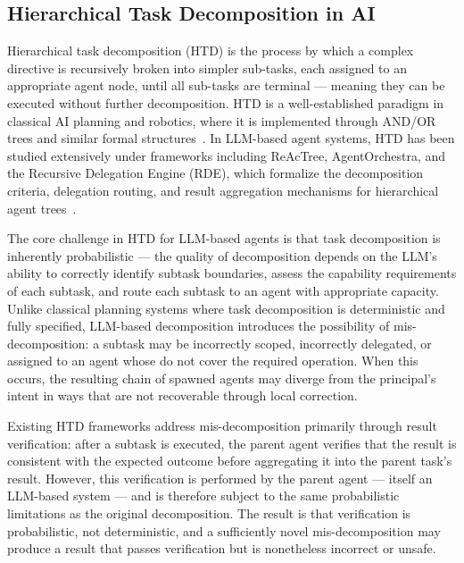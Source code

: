 \subsection{Hierarchical Task Decomposition in AI}
\label{sec:task-decomp}

Hierarchical task decomposition (HTD) is the process by which a complex directive is recursively broken into simpler sub-tasks, each assigned to an appropriate agent node, until all sub-tasks are terminal — meaning they can be executed without further decomposition. HTD is a well-established paradigm in classical AI planning and robotics, where it is implemented through AND/OR trees and similar formal structures~\cite{structuredagent2025}. In LLM-based agent systems, HTD has been studied extensively under frameworks including ReAcTree, AgentOrchestra, and the Recursive Delegation Engine (RDE), which formalize the decomposition criteria, delegation routing, and result aggregation mechanisms for hierarchical agent trees~\cite{reactree2025,agentorchestra2025,rde2025,rde2024,agentspawn2025}.

The core challenge in HTD for LLM-based agents is that task decomposition is inherently probabilistic — the quality of decomposition depends on the LLM's ability to correctly identify subtask boundaries, assess the capability requirements of each subtask, and route each subtask to an agent with appropriate capacity. Unlike classical planning systems where task decomposition is deterministic and fully specified, LLM-based decomposition introduces the possibility of mis-decomposition: a subtask may be incorrectly scoped, incorrectly delegated, or assigned to an agent whose \bounds{} do not cover the required operation. When this occurs, the resulting chain of spawned agents may diverge from the principal's intent in ways that are not recoverable through local correction.

Existing HTD frameworks address mis-decomposition primarily through result verification: after a subtask is executed, the parent agent verifies that the result is consistent with the expected outcome before aggregating it into the parent task's result. However, this verification is performed by the parent agent — itself an LLM-based system — and is therefore subject to the same probabilistic limitations as the original decomposition. The result is that verification is probabilistic, not deterministic, and a sufficiently novel mis-decomposition may produce a result that passes verification but is nonetheless incorrect or unsafe.

